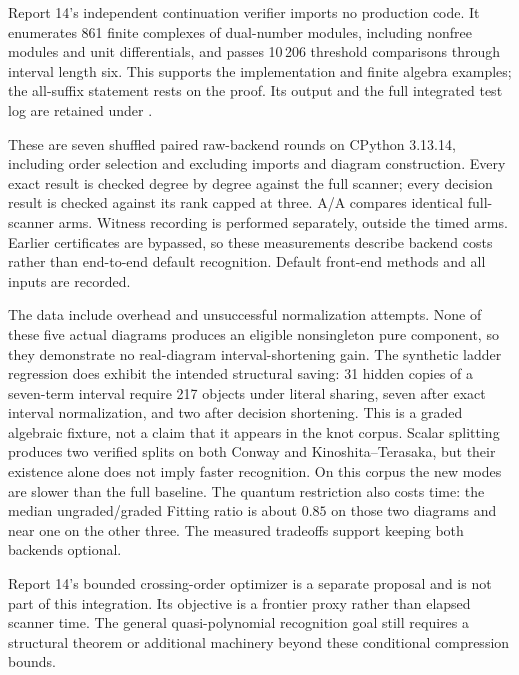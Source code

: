 Report 14's independent continuation verifier imports no production code.
It enumerates 861 finite complexes of dual-number modules, including
nonfree modules and unit differentials, and passes 10\,206 threshold
comparisons through interval length six. This supports the implementation
and finite algebra examples; the all-suffix statement rests on the proof.
Its output and the full integrated test log are retained under
.



These are seven shuffled paired raw-backend rounds on CPython 3.13.14,
including order selection and excluding imports and diagram construction.
Every exact result is checked degree by degree against the full scanner;
every decision result is checked against its rank capped at three. A/A
compares identical full-scanner arms. Witness recording is performed
separately, outside the timed arms. Earlier certificates are bypassed, so
these measurements describe backend costs rather than end-to-end default
recognition. Default front-end methods and all inputs are recorded.

The data include overhead and unsuccessful normalization attempts. None
of these five actual diagrams produces an eligible nonsingleton pure
component, so they demonstrate no real-diagram interval-shortening gain.
The synthetic ladder regression does exhibit the intended structural
saving: 31 hidden copies of a seven-term interval require 217 objects under
literal sharing, seven after exact interval normalization, and two after
decision shortening. This is a graded algebraic fixture, not a claim that
it appears in the knot corpus. Scalar splitting produces two verified splits on both Conway and
Kinoshita--Terasaka, but their existence alone does not imply faster recognition.
On this corpus the new modes are slower than the full baseline. The quantum
restriction also costs time: the median ungraded/graded Fitting ratio is
about $0.85$ on those two diagrams and near one on the other three.
The measured tradeoffs support keeping both backends optional.

Report 14's bounded crossing-order optimizer is a separate proposal and
is not part of this integration. Its objective is a frontier proxy rather
than elapsed scanner time. The general quasi-polynomial recognition goal
still requires a structural theorem or additional machinery beyond these
conditional compression bounds.
